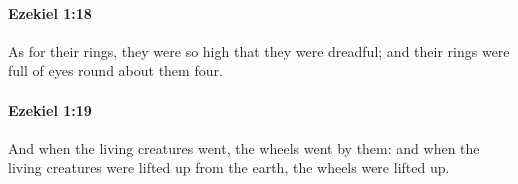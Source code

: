 		\paragraph{Ezekiel 1:18} %
			\label{EZEKIEL-1-18}

			As for their rings, they were so high that they were dreadful; and their rings were full of eyes round about them four.


		\paragraph{Ezekiel 1:19} %
			\label{EZEKIEL-1-19}

			And when the living creatures went, the wheels went by them: and when the living creatures were lifted up from the earth, the wheels were lifted up.


